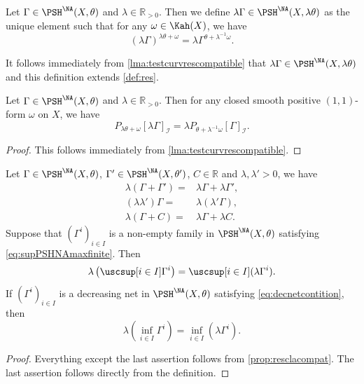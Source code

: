 \begin{definition}\label{def:NApotential:L572}
    Let $\Gamma\in \PSH^{\NA}(X,\theta)$ and $\lambda\in \mathbb{R}_{>0}$. Then we define $\lambda \Gamma\in \PSH^{\NA}(X,\lambda\theta)$ as the unique element such that for any $\omega\in \Kah(X)$, we have
    \[
    \left( \lambda\Gamma \right)^{\lambda\theta+\omega}=\lambda \Gamma^{\theta+\lambda^{-1}\omega}.
    \]
\end{definition}
It follows immediately from \cref{lma:testcurvrescompatible} that $\lambda \Gamma\in \PSH^{\NA}(X,\lambda\theta)$ and this definition extends \cref{def:res}.

\begin{proposition}\label{prop:NApotential:L581}
    Let $\Gamma\in \PSH^{\NA}(X,\theta)$ and $\lambda\in \mathbb{R}_{>0}$. Then for any closed smooth positive $(1,1)$-form $\omega$ on $X$, we have
    \[
    P_{\lambda\theta+\omega}[\lambda\Gamma]_{\mathcal{I}}=\lambda P_{\theta+\lambda^{-1}\omega}[\Gamma]_{\mathcal{I}}.
    \]
\end{proposition}
\begin{proof}
    This follows immediately from \cref{lma:testcurvrescompatible}.
\end{proof}

\begin{proposition}\label{prop:resclacompat2}
    Let $\Gamma\in \PSH^{\NA}(X,\theta)$, $\Gamma'\in \PSH^{\NA}(X,\theta')$, $C\in \mathbb{R}$ and $\lambda,\lambda'>0$, we have
    \[
        \begin{aligned}
        \lambda(\Gamma+\Gamma')=&\lambda\Gamma+\lambda\Gamma',\\
        (\lambda\lambda')\Gamma=&\lambda(\lambda'\Gamma),\\
        \lambda(\Gamma+C)=&\lambda\Gamma+\lambda C.
        \end{aligned}
    \]
    Suppose that $(\Gamma^i)_{i\in I}$ is a non-empty family in $\PSH^{\NA}(X,\theta)$ satisfying \eqref{eq:supPSHNAmaxfinite}. Then
    \[
    \lambda \left( \uscsup[i\in I]\Gamma^i \right)=\uscsup[i\in I](\lambda \Gamma^i).
    \]
    If $(\Gamma^i)_{i\in I}$ is a decreasing net in $\PSH^{\NA}(X,\theta)$ satisfying \eqref{eq:decnetcontition}, then
    \[
    \lambda \left( \inf_{i\in I}\Gamma^i \right)=\inf_{i\in I}(\lambda \Gamma^i).
    \]
\end{proposition}
\begin{proof}
Everything except the last assertion follows from \cref{prop:resclacompat}. The last assertion follows directly from the definition.
\end{proof}

